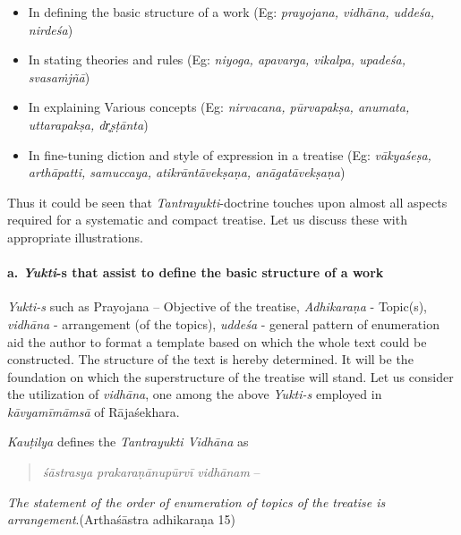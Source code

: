 \begin{itemize}
\item In defining the basic structure of a work (Eg: \textit{prayojana, vidhāna, uddeśa, nirdeśa})

 \item In stating theories and rules (Eg: \textit{niyoga, apavarga, vikalpa, upadeśa, svasaṁjñā})

 \item In explaining Various concepts (Eg: \textit{nirvacana, pūrvapakṣa, anumata, uttarapakṣa, dr̥ṣṭānta})

 \item In fine-tuning diction and style of expression in a treatise (Eg: \textit{vākyaśeṣa, arthāpatti, samuccaya, atikrāntāvekṣaṇa, anāgatāvekṣaṇa})

\end{itemize}

Thus it could be seen that \textit{Tantrayukti}-doctrine touches upon almost all aspects required for a systematic and compact treatise. Let us discuss these with appropriate illustrations.

\paragraph*{a. \textit{Yukti}-s that assist to define the basic structure of a work}

\textit{Yukti-s} such as Prayojana – Objective of the treatise, \textit{Adhikaraṇa} - Topic(s), \textit{vidhāna} - arrangement (of the topics), \textit{uddeśa} - general pattern of enumeration aid the author to format a template based on which the whole text could be constructed. The structure of the text is hereby determined. It will be the foundation on which the superstructure of the treatise will stand. Let us consider the utilization of \textit{vidhāna}, one among the above \textit{Yukti-s} employed in \textit{kāvyamīmāmsā} of Rājaśekhara.

\textit{Kauṭilya} defines the \textit{Tantrayukti Vidhāna} as

\begin{verse}
\textit{śāstrasya prakaraṇānupūrvī vidhānam} –
\end{verse}

\begin{myquote}
\textit{The statement of the order of enumeration of topics of the treatise is arrangement}.\hfill (Arthaśāstra adhikaraṇa 15)
\end{myquote}

